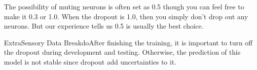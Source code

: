 \documentclass{UoNMCHA}
\numberwithin{equation}{section}
\begin{document}
The possibility of muting neurons is often set as 0.5 though you can feel free to make it 0.3 or 1.0. When the dropout is 1.0, then you simply don't drop out any neurons. But our experience tells us 0.5 is usually the best choice.

ExtraSensory Data BreakdoAfter finishing the training, it is important to turn off the dropout during development and testing. Otherwise, the prediction of this model is not stable since dropout add uncertainties to it.


\newpage
\end{document}

